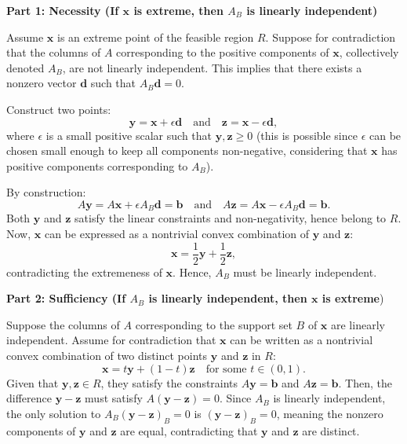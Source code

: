 \documentclass[8pt]{article}
\begin{document}
\textbf{Part 1: Necessity (If \(\mathbf{x}\) is extreme, then \(A_B\) is linearly independent)}

Assume \(\mathbf{x}\) is an extreme point of the feasible region \(R\). Suppose for contradiction that the columns of \(A\) corresponding to the positive components of \(\mathbf{x}\), collectively denoted \(A_B\), are not linearly independent. This implies that there exists a nonzero vector \(\mathbf{d}\) such that \(A_B \mathbf{d} = 0\).

Construct two points:
\[
\mathbf{y} = \mathbf{x} + \epsilon \mathbf{d} \quad \text{and} \quad \mathbf{z} = \mathbf{x} - \epsilon \mathbf{d},
\]
where \(\epsilon\) is a small positive scalar such that \(\mathbf{y}, \mathbf{z} \geq 0\) (this is possible since \(\epsilon\) can be chosen small enough to keep all components non-negative, considering that \(\mathbf{x}\) has positive components corresponding to \(A_B\)).

By construction:
\[
A\mathbf{y} = A\mathbf{x} + \epsilon A_B \mathbf{d} = \mathbf{b} \quad \text{and} \quad A\mathbf{z} = A\mathbf{x} - \epsilon A_B \mathbf{d} = \mathbf{b}.
\]
Both \(\mathbf{y}\) and \(\mathbf{z}\) satisfy the linear constraints and non-negativity, hence belong to \(R\). Now, \(\mathbf{x}\) can be expressed as a nontrivial convex combination of \(\mathbf{y}\) and \(\mathbf{z}\):
\[
\mathbf{x} = \frac{1}{2}\mathbf{y} + \frac{1}{2}\mathbf{z},
\]
contradicting the extremeness of \(\mathbf{x}\). Hence, \(A_B\) must be linearly independent.

\textbf{Part 2: Sufficiency (If \(A_B\) is linearly independent, then \(\mathbf{x}\) is extreme})

Suppose the columns of \(A\) corresponding to the support set \(B\) of \(\mathbf{x}\) are linearly independent. Assume for contradiction that \(\mathbf{x}\) can be written as a nontrivial convex combination of two distinct points \(\mathbf{y}\) and \(\mathbf{z}\) in \(R\):
\[
\mathbf{x} = t\mathbf{y} + (1 - t)\mathbf{z} \quad \text{for some } t \in (0,1).
\]
Given that \(\mathbf{y}, \mathbf{z} \in R\), they satisfy the constraints \(A\mathbf{y} = \mathbf{b}\) and \(A\mathbf{z} = \mathbf{b}\). Then, the difference \(\mathbf{y} - \mathbf{z}\) must satisfy \(A(\mathbf{y} - \mathbf{z}) = 0\). Since \(A_B\) is linearly independent, the only solution to \(A_B(\mathbf{y} - \mathbf{z})_B = 0\) is \((\mathbf{y} - \mathbf{z})_B = 0\), meaning the nonzero components of \(\mathbf{y}\) and \(\mathbf{z}\) are equal, contradicting that \(\mathbf{y}\) and \(\mathbf{z}\) are distinct.
\end{document}
